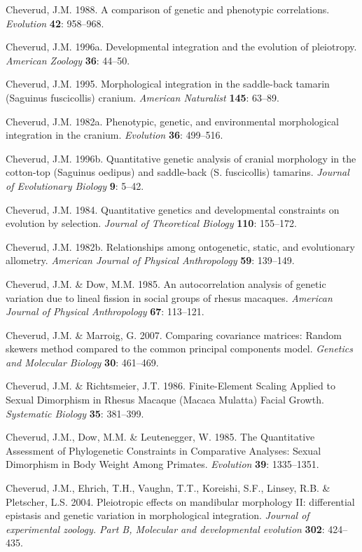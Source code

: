 \documentclass[12pt,twoside]{report}
\begin{document}
Cheverud, J.M. 1988. A comparison of genetic and phenotypic
correlations. \emph{Evolution} \textbf{42}: 958--968.

Cheverud, J.M. 1996a. Developmental integration and the evolution of
pleiotropy. \emph{American Zoology} \textbf{36}: 44--50.

Cheverud, J.M. 1995. Morphological integration in the saddle-back
tamarin (Saguinus fuscicollis) cranium. \emph{American Naturalist}
\textbf{145}: 63--89.

Cheverud, J.M. 1982a. Phenotypic, genetic, and environmental
morphological integration in the cranium. \emph{Evolution} \textbf{36}:
499--516.

Cheverud, J.M. 1996b. Quantitative genetic analysis of cranial
morphology in the cotton-top (Saguinus oedipus) and saddle-back (S.
fuscicollis) tamarins. \emph{Journal of Evolutionary Biology}
\textbf{9}: 5--42.

Cheverud, J.M. 1984. Quantitative genetics and developmental constraints
on evolution by selection. \emph{Journal of Theoretical Biology}
\textbf{110}: 155--172.

Cheverud, J.M. 1982b. Relationships among ontogenetic, static, and
evolutionary allometry. \emph{American Journal of Physical Anthropology}
\textbf{59}: 139--149.

Cheverud, J.M. \& Dow, M.M. 1985. An autocorrelation analysis of genetic
variation due to lineal fission in social groups of rhesus macaques.
\emph{American Journal of Physical Anthropology} \textbf{67}: 113--121.

Cheverud, J.M. \& Marroig, G. 2007. Comparing covariance matrices:
Random skewers method compared to the common principal components model.
\emph{Genetics and Molecular Biology} \textbf{30}: 461--469.

Cheverud, J.M. \& Richtsmeier, J.T. 1986. Finite-Element Scaling Applied
to Sexual Dimorphism in Rhesus Macaque (Macaca Mulatta) Facial Growth.
\emph{Systematic Biology} \textbf{35}: 381--399.

Cheverud, J.M., Dow, M.M. \& Leutenegger, W. 1985. The Quantitative
Assessment of Phylogenetic Constraints in Comparative Analyses: Sexual
Dimorphism in Body Weight Among Primates. \emph{Evolution} \textbf{39}:
1335--1351.

Cheverud, J.M., Ehrich, T.H., Vaughn, T.T., Koreishi, S.F., Linsey, R.B.
\& Pletscher, L.S. 2004. Pleiotropic effects on mandibular morphology
II: differential epistasis and genetic variation in morphological
integration. \emph{Journal of experimental zoology. Part B, Molecular
and developmental evolution} \textbf{302}: 424--435.
\end{document}
